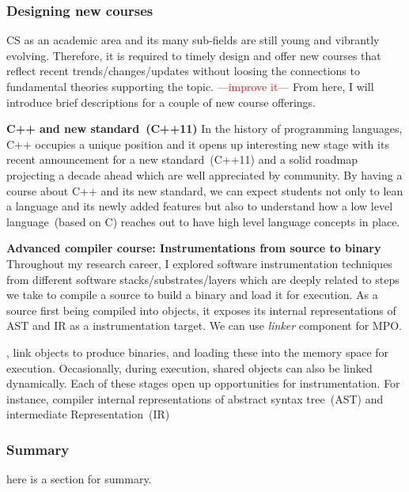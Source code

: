 \documentclass[letterpaper, 10pt]{article}
\newcommand{\jikk}[1]{{---\textcolor{red}{#1}---}}
\newcommand{\jikk}[1]{}
\begin{document}
\begin{small}
\subsubsection*{Designing new courses} 

CS as an academic area and its many sub-fields are still young and vibrantly
evolving. Therefore, it is required to timely design and offer new courses that
reflect recent trends/changes/updates without loosing the connections to
fundamental theories supporting the topic. \jikk{improve it} From here, I will
introduce brief descriptions for a couple of new course offerings.
%

{\bf C++ and new standard~(C++11)} In the history of programming languages, C++
occupies a unique position and it opens up interesting new stage with its
recent announcement for a new standard~(C++11) and a solid roadmap projecting a
decade ahead which are well appreciated by community.
%
%
By having a course about C++ and its new standard, we can expect students not
only to lean a language and its newly added features but also to understand how
a low level language~(based on C) reaches out to have high level language
concepts in place. 

{\bf Advanced compiler course: Instrumentations from source to binary} 
Throughout my research career, I explored software instrumentation techniques
from different software stacks/substrates/layers which are deeply related to
steps we take to compile a source to build a binary and load it for execution. 
%
As a source first being compiled into objects, it exposes its internal
representations of AST and IR as a instrumentation target. We can use {\it
linker} component for MPO. 


, link objects to produce binaries, and
loading these into the memory space for execution. Occasionally, during
execution, shared objects can also be linked dynamically.
%
Each of these stages open up opportunities for instrumentation. For instance,
compiler internal representations of abstract syntax tree~(AST) and
intermediate Representation~(IR)

\subsubsection*{Summary}
here is a section for summary.
\end{small}
\end{document}
